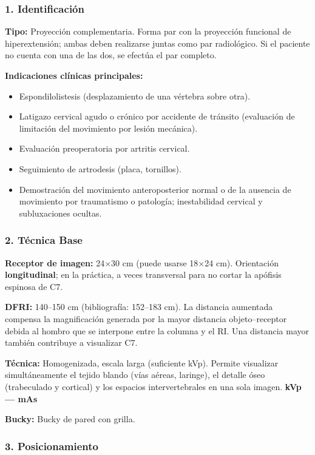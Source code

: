 	\subsubsection*{1. Identificación}
	
	\textbf{Tipo:} Proyección complementaria. Forma par con la proyección funcional de hiperextensión; ambas deben realizarse juntas como par radiológico. Si el paciente no cuenta con una de las dos, se efectúa el par completo.
	
	\textbf{Indicaciones clínicas principales:}
	\begin{itemize}
		\item Espondilolistesis (desplazamiento de una vértebra sobre otra).
		\item Latigazo cervical agudo o crónico por accidente de tránsito (evaluación de limitación del movimiento por lesión mecánica).
		\item Evaluación preoperatoria por artritis cervical.
		\item Seguimiento de artrodesis (placa, tornillos).
		\item Demostración del movimiento anteroposterior normal o de la ausencia de movimiento por traumatismo o patología; inestabilidad cervical y subluxaciones ocultas.
	\end{itemize}
	
	\subsubsection*{2. Técnica Base}
	
	\textbf{Receptor de imagen:} 24$\times$30 cm (puede usarse 18$\times$24 cm). Orientación \textbf{longitudinal}; en la práctica, a veces transversal para no cortar la apófisis espinosa de C7.
	
	\textbf{DFRI:} 140--150 cm (bibliografía: 152--183 cm). La distancia aumentada compensa la magnificación generada por la mayor distancia objeto--receptor debida al hombro que se interpone entre la columna y el RI.  Una distancia mayor también contribuye a visualizar C7.
	
	\textbf{Técnica:} Homogenizada, escala larga (suficiente kVp). Permite visualizar simultáneamente el tejido blando (vías aéreas, laringe), el detalle óseo (trabeculado y cortical) y los espacios intervertebrales en una sola imagen. \textbf{kVp --- mAs}
	
	\textbf{Bucky:} Bucky de pared con grilla.
	
	\subsubsection*{3. Posicionamiento}
	
